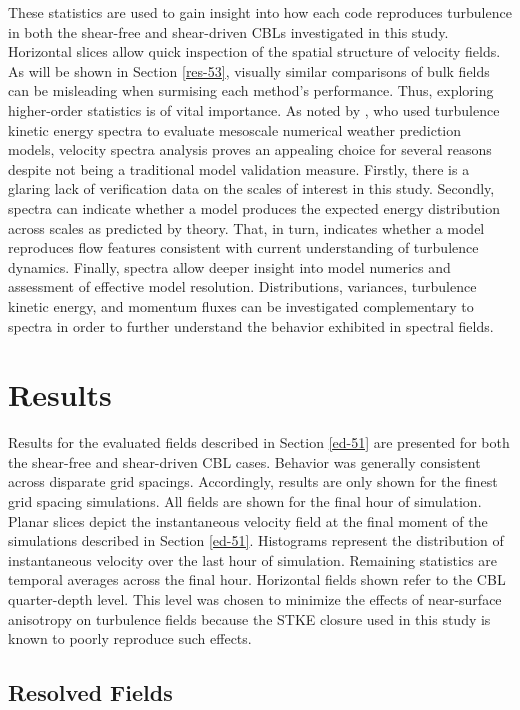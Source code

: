 These statistics are used to gain insight into how each code reproduces turbulence in both the shear-free and shear-driven CBLs investigated in this study. Horizontal slices allow quick inspection of the spatial structure of velocity fields. As will be shown in Section \autoref{res-53}, visually similar comparisons of bulk fields can be misleading when surmising each method's performance. Thus, exploring higher-order statistics is of vital importance. As noted by  \citet{Skamarock04}, who used turbulence kinetic energy spectra to evaluate mesoscale numerical weather prediction models, velocity spectra analysis proves an appealing choice for several reasons despite not being a traditional model validation measure. Firstly, there is a glaring lack of verification data on the scales of interest in this study. Secondly, spectra can indicate whether a model produces the expected energy distribution across scales as predicted by theory. That, in turn, indicates whether a model reproduces flow features consistent with current understanding of turbulence dynamics. Finally, spectra allow deeper insight into model numerics and assessment of effective model resolution. Distributions, variances, turbulence kinetic energy, and momentum fluxes can be investigated complementary to spectra in order to further understand the behavior exhibited in spectral fields.

\section{Results}
\label{res-53}

Results for the evaluated fields described in Section \autoref{ed-51} are presented for both the shear-free and shear-driven CBL cases. Behavior was generally consistent across disparate grid spacings. Accordingly, results are only shown for the finest grid spacing simulations. All fields are shown for the final hour of simulation. Planar slices depict the instantaneous velocity field at the final moment of the simulations described in Section \autoref{ed-51}. Histograms represent the distribution of instantaneous velocity over the last hour of simulation. Remaining statistics are temporal averages across the final hour. Horizontal fields shown refer to the CBL quarter-depth level. This level was chosen to minimize the effects of near-surface anisotropy on turbulence fields because the STKE closure used in this study is known to poorly reproduce such effects.

\subsection{Resolved Fields}
\label{resolve-531}

